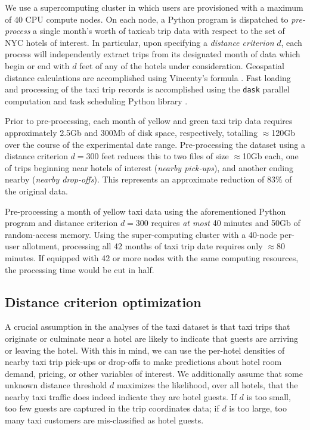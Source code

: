 \documentclass[useAMS, usenatbib]{biom}
\begin{document}
We use a supercomputing cluster in which users are provisioned with a maximum of 40 CPU compute nodes. On each node, a Python program is dispatched to \textit{pre-process} a single month's worth of taxicab trip data with respect to the set of NYC hotels of interest. In particular, upon specifying a \textit{distance criterion} $d$, each process will independently extract trips from its designated month of data which begin or end with $d$ feet of any of the hotels under consideration. Geospatial distance calculations are accomplished using Vincenty's formula \citep{bessel_calculation_2010}. Fast loading and processing of the taxi trip records is accomplished using the \texttt{dask} parallel computation and task scheduling Python library \citep{dask}.

Prior to pre-processing, each month of yellow and green taxi trip data requires approximately 2.5Gb and 300Mb of disk space, respectively, totalling $\approx$120Gb over the course of the experimental date range. Pre-processing the dataset using a distance criterion $d = 300$ feet reduces this to two files of size $\approx$10Gb each, one of trips beginning near hotels of interest (\textit{nearby pick-ups}), and another ending nearby (\textit{nearby drop-offs}). This represents an approximate reduction of 83\% of the original data.

Pre-processing a month of yellow taxi data using the aforementioned Python program and distance criterion $d = 300$ requires \textit{at most} 40 minutes and 50Gb of random-access memory. Using the super-computing cluster with a 40-node per-user allotment, processing all 42 months of taxi trip date requires only $\approx$80 minutes. If equipped with 42 or more nodes with the same computing resources, the processing time would be cut in half.

\subsection{Distance criterion optimization}

A crucial assumption in the analyses of the taxi dataset is that taxi trips that originate or culminate near a hotel are likely to indicate that guests are arriving or leaving the hotel. With this in mind, we can use the per-hotel densities of nearby taxi trip pick-ups or drop-offs to make predictions about hotel room demand, pricing, or other variables of interest. We additionally assume that some unknown distance threshold $d$ maximizes the likelihood, over all hotels, that the nearby taxi traffic does indeed indicate they are hotel guests. If $d$ is too small, too few guests are captured in the trip coordinates data; if $d$ is too large, too many taxi customers are mis-classified as hotel guests.
\end{document}
